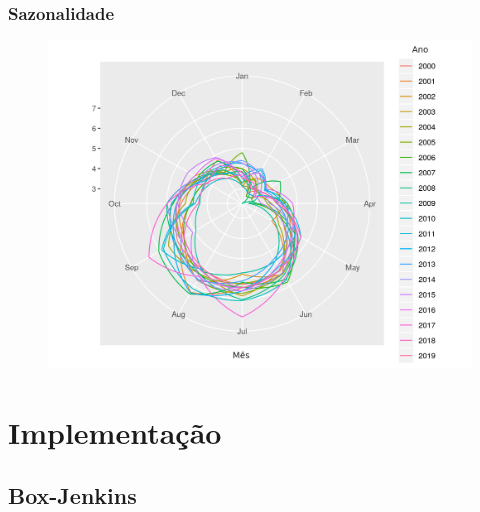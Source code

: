 \documentclass[mathserif,serif]{beamer}
\begin{document}
\begin{frame}
	\frametitle{Sazonalidade}
	\begin{figure}
		\centering
		\includegraphics[scale=0.6]{season_plot_polar}
	\end{figure}
\end{frame}

\section{Implementação}

\subsection{Box-Jenkins}
\end{document}
